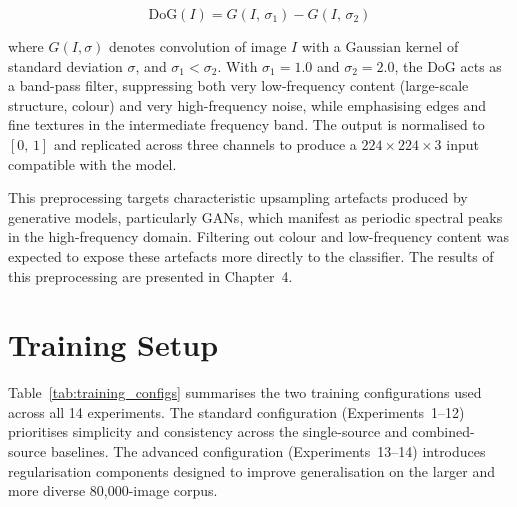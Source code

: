 \begin{equation}
  \text{DoG}(I) = G(I,\, \sigma_1) - G(I,\, \sigma_2)
  \label{eq:dog}
\end{equation}

where $G(I, \sigma)$ denotes convolution of image $I$ with a Gaussian kernel of standard
deviation $\sigma$, and $\sigma_1 < \sigma_2$. With $\sigma_1 = 1.0$ and $\sigma_2 = 2.0$, the
DoG acts as a band-pass filter, suppressing both very low-frequency content (large-scale
structure, colour) and very high-frequency noise, while emphasising edges and fine textures in
the intermediate frequency band. The output is normalised to $[0,\,1]$ and replicated across
three channels to produce a $224 \times 224 \times 3$ input compatible with the model.

This preprocessing targets characteristic upsampling artefacts produced by generative models,
particularly GANs, which manifest as periodic spectral peaks in the high-frequency domain.
Filtering out colour and low-frequency content was expected to expose these artefacts more
directly to the classifier. The results of this preprocessing are presented in Chapter~4.


\section{Training Setup}
\label{sec:training}

Table~\ref{tab:training_configs} summarises the two training configurations used across
all 14 experiments. The standard configuration (Experiments~1--12) prioritises
simplicity and consistency across the single-source and combined-source baselines. The
advanced configuration (Experiments~13--14) introduces regularisation components designed
to improve generalisation on the larger and more diverse 80,000-image corpus.

